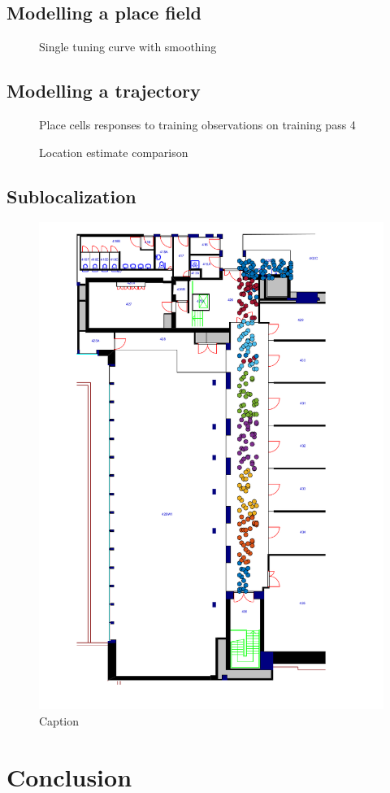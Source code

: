 \subsection{Modelling a place field}

\begin{figure}
	\centering
	\setlength{}
	\setlength{}
		
	\caption{Single tuning curve with smoothing}
\end{figure}



\subsection{Modelling a trajectory}

\begin{figure}
	\centering
	\setlength{}
	\setlength{}

\caption{Place cells responses to training observations on training pass 4}
\label{}
\end{figure}

\begin{figure}
	\centering
	\setlength{}
	\setlength{}
		
	\caption{Location estimate comparison}
\end{figure}

\subsection{Sublocalization}

\begin{figure}
\centering
\includegraphics[width=.6\linewidth]{./gfx/Chapter05//placeCellsExperiment_withDetection_5px.png}
\caption{Caption}
\label{}
\end{figure}

\section{Conclusion}


